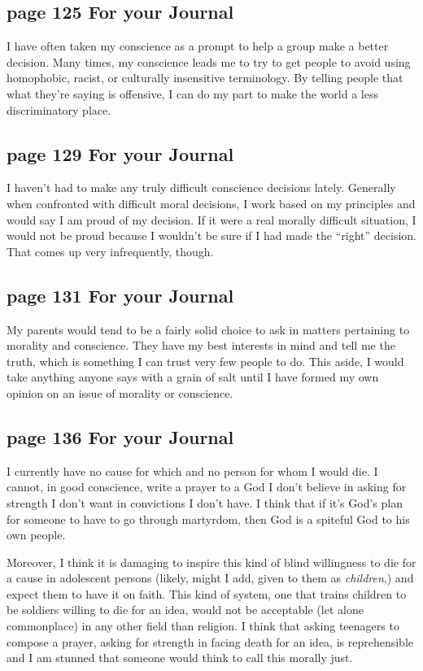 \documentclass[12pt]{article}
\begin{document}
\subsection{page 125 For your Journal}
	I have often taken my conscience as a prompt to help a group make a better
	decision.  Many times, my conscience leads me to try to get people to
	avoid using homophobic, racist, or culturally insensitive terminology.  By
	telling people that what they're saying is offensive, I can do my
	part to make the world a less discriminatory place.

\subsection{page 129 For your Journal}
	I haven't had to make any truly difficult conscience decisions lately.
	Generally when confronted with difficult moral decisions, I work based on
	my principles and would say I am proud of my decision.  If it were a real
	morally difficult situation, I would not be proud because I wouldn't be
	sure if I had made the ``right'' decision.  That comes up very infrequently,
	though.

\subsection{page 131 For your Journal}
	My parents would tend to be a fairly solid choice to ask in matters 
	pertaining to morality and conscience.  They have my best interests in mind
	and tell me the truth, which is something I can trust very few people to
	do.  This aside, I would take anything anyone says with a grain of salt until
	I have formed my own opinion on an issue of morality or conscience.

\subsection{page 136 For your Journal}
	I currently have no cause for which and no person for whom I would die.  I 
	cannot, in good conscience, write a prayer to a God I don't believe in 
	asking for strength I don't want in convictions I don't have.  I think that
	if it's God's plan for someone to have to go through martyrdom, then God
	is a spiteful God to his own people.

	Moreover, I think it is damaging to inspire this kind of blind willingness
	to die for a cause in adolescent persons (likely, might I add, given to them
	as {\it children},) and expect them to have it on faith.  This kind of system,
	one that trains children to be soldiers willing to die for an idea, would not 
	be acceptable	(let alone commonplace) in any other field than religion.  I 
	think that asking teenagers to compose a prayer, asking for strength in facing
	death for an idea, is reprehensible and I am stunned that someone would think
	to call this morally just.
\end{document}
